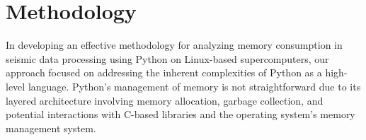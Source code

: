 \section{Methodology}

In developing an effective methodology for analyzing memory consumption in seismic data processing using Python on Linux-based supercomputers, our approach focused on addressing the inherent complexities of Python as a high-level language.
Python's management of memory is not straightforward due to its layered architecture involving memory allocation, garbage collection, and potential interactions with C-based libraries and the operating system's memory management system.







